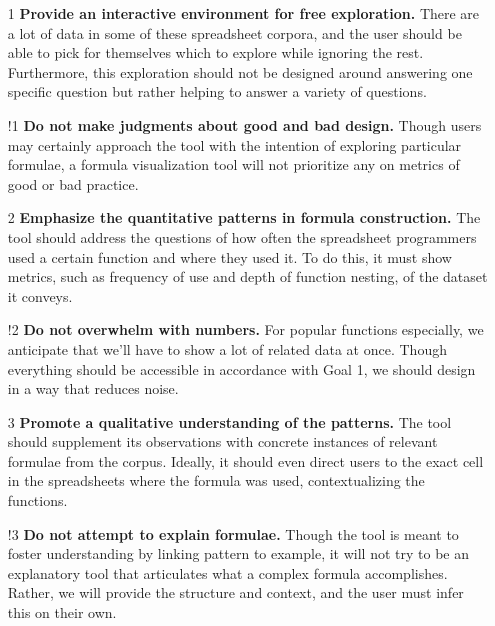 \documentclass[conference]{IEEEtran}
\begin{document}
	\begin{itemize}
		
		\item [1] \textbf{Provide an interactive environment for free exploration.}
		There are a lot of data in some of these spreadsheet corpora, and the user
		should be able to pick for themselves which to explore while ignoring the
		rest. Furthermore, this exploration should not be designed around answering
		one specific question but rather helping to answer a variety of questions.
		
		\item [!1] \textbf{Do not make judgments about good and bad design.} Though
		users may certainly approach the tool with the intention of exploring
		particular formulae, a formula visualization tool will not prioritize any on
		metrics of good or bad practice.
		
		\item [2] \textbf{Emphasize the quantitative patterns in formula
			construction.} The tool should address the questions of how often the
		spreadsheet programmers used a certain function and where they used it. To do
		this, it must show metrics, such as frequency of use and depth of function
		nesting, of the dataset it conveys.
		
		\item [!2] \textbf{Do not overwhelm with numbers.} For popular functions
		especially, we anticipate that we'll have to show a lot of related data at
		once. Though everything should be accessible in accordance with Goal 1, we
		should design in a way that reduces noise.
		
		\item [3] \textbf{Promote a qualitative understanding of the patterns.} The
		tool should supplement its observations with concrete instances of relevant
		formulae from the corpus. Ideally, it should even direct users to the exact
		cell in the spreadsheets where the formula was used, contextualizing the
		functions.
		
		\item [!3] \textbf{Do not attempt to explain formulae.} Though the tool is
		meant to foster understanding by linking pattern to example, it will not try
		to be an explanatory tool that articulates what a complex formula
		accomplishes. Rather, we will provide the structure and context, and the user
		must infer this on their own.
		
	\end{itemize}
	
\end{document}
